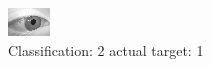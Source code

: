 \begin{figure}[h!]
\begin{center}
\includegraphics[width=0.60\columnwidth]{figures/ID2726_class_2_target_1.png}
\end{center}
\caption{ Classification: 2 actual target: 1}
\label{fig:ID2726_class_2_target_1}
\end{figure}

